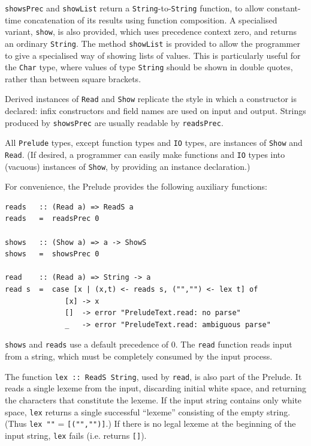 \mbox{\tt showsPrec} and \mbox{\tt showList} return a \mbox{\tt String}-to-\mbox{\tt String}
function, to allow constant-time concatenation of its results using function
composition.
A specialised variant, \mbox{\tt show}, is also provided, which
uses precedence context zero, and returns an ordinary \mbox{\tt String}.
The method \mbox{\tt showList} is provided to allow the programmer to
give a specialised way of showing lists of values.  This is particularly
useful for the \mbox{\tt Char} type, where values of type \mbox{\tt String} should be
shown in double quotes, rather than between square brackets.

Derived instances of \mbox{\tt Read} and \mbox{\tt Show} replicate the style in which a
constructor is declared: infix constructors and field names are used
on input and output.  Strings produced by \mbox{\tt showsPrec} are usually
readable by \mbox{\tt readsPrec}.  

All \mbox{\tt Prelude} types, except function types and \mbox{\tt IO} types,
are instances of \mbox{\tt Show} and \mbox{\tt Read}.
(If desired, a programmer can easily make functions and \mbox{\tt IO} types 
into (vacuous) instances of \mbox{\tt Show}, by providing an instance declaration.)

For convenience, the Prelude provides the following auxiliary
functions: 
\bprog
{\small\begin{verbatim}
reads   :: (Read a) => ReadS a
reads   =  readsPrec 0

shows   :: (Show a) => a -> ShowS
shows   =  showsPrec 0

read    :: (Read a) => String -> a
read s  =  case [x | (x,t) <- reads s, ("","") <- lex t] of
              [x] -> x
              []  -> error "PreludeText.read: no parse"
              _   -> error "PreludeText.read: ambiguous parse"
\end{verbatim}}
\eprog
{}
\mbox{\tt shows} and \mbox{\tt reads} use a default precedence of 0.  The \mbox{\tt read} function reads
input from a string, which must be completely consumed by the input
process.  

The function \mbox{\tt lex\ ::\ ReadS\ String}, used by \mbox{\tt read}, is also part of the Prelude.
It reads a single lexeme from the input, discarding initial white space, and
returning the characters that constitute the lexeme.  If the input string contains
only white space, \mbox{\tt lex} returns a single successful ``lexeme'' consisting of the
empty string.  (Thus \mbox{\tt lex\ ""} = \mbox{\tt [("","")]}.)  If there is no legal lexeme at the
beginning of the input string, \mbox{\tt lex} fails (i.e. returns \mbox{\tt []}).


